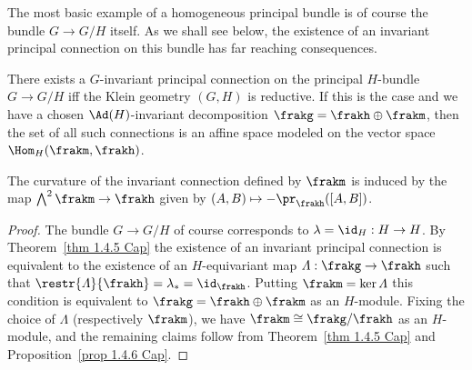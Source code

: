 The most basic example of a homogeneous principal bundle is of course the bundle $G\to G\slash H$ itself. As we shall see below, the existence of an invariant principal connection on this bundle has far reaching consequences.

\begin{cor}\label{cor 1.4.6 Cap}
    There exists a $G$-invariant principal connection on the principal $H$-bundle $G\to G\slash H$ iff the Klein geometry $(G,H)$ is reductive. If this is the case and we have a chosen $\Ad(H)$-invariant decomposition $\frakg=\frakh\oplus\frakm$, then the set of all such connections is an affine space modeled on the vector space $\Hom_H(\frakm,\frakh)$.

    The curvature of the invariant connection defined by $\frakm$ is induced by the map $\bigwedge\nolimits^2\frakm\to\frakh$ given by $(A,B)\mapsto -\pr_\frakh([A,B])$.
\end{cor}
\begin{proof}
    The bundle $G\to G\slash H$ of course corresponds to $\lambda=\id_H:H\to H$. By Theorem~\ref{thm 1.4.5 Cap} the existence of an invariant principal connection is equivalent to the existence of an $H$-equivariant map $\varLambda:\frakg\to\frakh$ such that $\restr{\varLambda}{\frakh}=\lambda_\ast=\id_\frakh$. Putting $\frakm=\ker\varLambda$ this condition is equivalent to $\frakg=\frakh\oplus \frakm$ as an $H$-module. Fixing the choice of $\varLambda$ (respectively $\frakm$), we have $\frakm\cong \frakg\slash\frakh$ as an $H$-module, and the remaining claims follow from Theorem~\ref{thm 1.4.5 Cap} and Proposition~\ref{prop 1.4.6 Cap}.
\end{proof}


